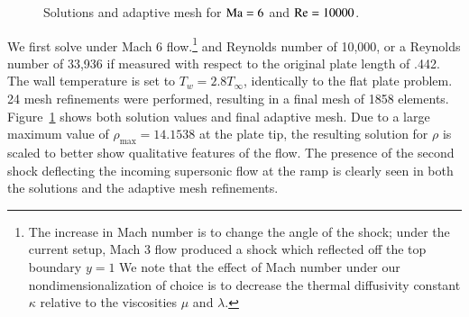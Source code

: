 \begin{figure}
\centering
{}
\caption{Solutions and adaptive mesh for ${\rm Ma} = 6$ and $\Reyn = 10000$.}
\label{fig:holdenMa6}
\end{figure}

We first solve under Mach 6 flow.\footnote{The increase in Mach number is to change the angle of the shock; under the current setup, Mach 3 flow produced a shock which reflected off the top boundary $y = 1$  We note that the effect of Mach number under our nondimensionalization of choice is to decrease the thermal diffusivity constant $\kappa$ relative to the viscosities $\mu$ and $\lambda$.} and Reynolds number of 10,000, or a Reynolds number of 33,936 if measured with respect to the original plate length of .442.  The wall temperature is set to $T_{w} = 2.8T_{\infty}$, identically to the flat plate problem.  24 mesh refinements were performed, resulting in a final mesh of 1858 elements.  Figure~\ref{fig:holdenMa6} shows both solution values and final adaptive mesh.  Due to a large maximum value of $\rho_{\max} = 14.1538$ at the plate tip, the resulting solution for $\rho$ is scaled to better show qualitative features of the flow.  The presence of the second shock deflecting the incoming supersonic flow at the ramp is clearly seen in both the solutions and the adaptive mesh refinements.  

